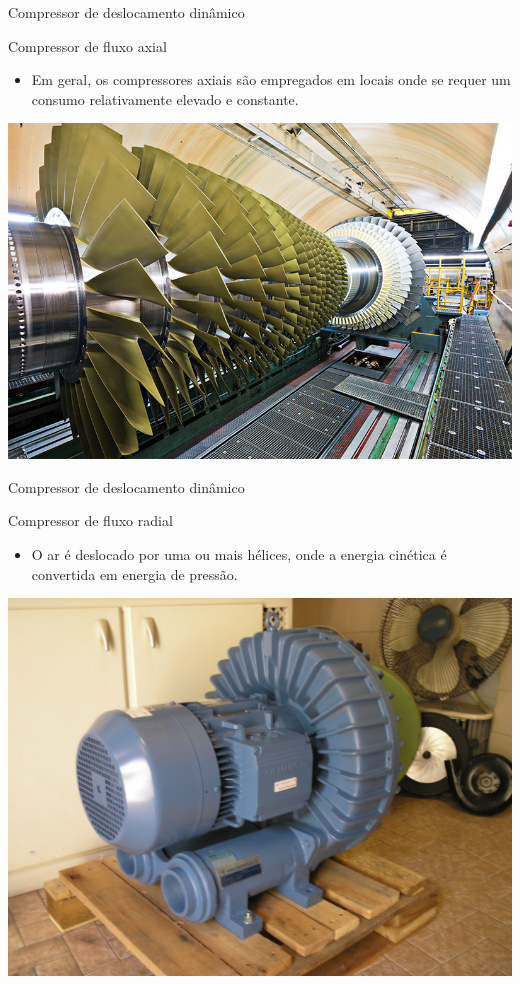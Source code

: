 

\begin{frame}{Compressor de deslocamento dinâmico}
	\begin{block}{Compressor de fluxo axial}
		\begin{itemize}
			\item Em geral, os compressores axiais são empregados em locais onde se requer um consumo relativamente elevado e constante.
		\end{itemize}
	\end{block}
	
	
	\centering
	\includegraphics[width=0.7\linewidth]{Figuras/Ch12/fig6}
\end{frame}


\begin{frame}{Compressor de deslocamento dinâmico}
	\begin{block}{Compressor de fluxo radial}
		\begin{itemize}
			\item O ar é deslocado por uma ou mais hélices, onde a energia cinética é convertida em energia de pressão.
		\end{itemize}
	\end{block}
	
	
	\centering
	\includegraphics[width=0.65\linewidth]{Figuras/Ch12/fig7}
\end{frame}


